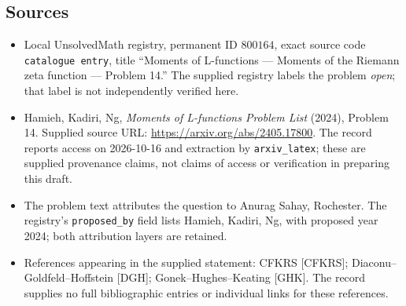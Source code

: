 \documentclass[11pt]{article}
\begin{document}
\subsection{Sources}
\begin{itemize}
\item Local UnsolvedMath registry, permanent ID \(800164\), exact source code \texttt{catalogue entry}, title ``Moments of L-functions --- Moments of the Riemann zeta function --- Problem 14.'' The supplied registry labels the problem \emph{open}; that label is not independently verified here.
\item Hamieh, Kadiri, Ng, \emph{Moments of L-functions Problem List} (2024), Problem 14. Supplied source URL: \url{https://arxiv.org/abs/2405.17800}. The record reports access on 2026-10-16 and extraction by \texttt{arxiv\_latex}; these are supplied provenance claims, not claims of access or verification in preparing this draft.
\item The problem text attributes the question to Anurag Sahay, Rochester. The registry's \texttt{proposed\_by} field lists Hamieh, Kadiri, Ng, with proposed year 2024; both attribution layers are retained.
\item References appearing in the supplied statement: CFKRS [CFKRS]; Diaconu--Goldfeld--Hoffstein [DGH]; Gonek--Hughes--Keating [GHK]. The record supplies no full bibliographic entries or individual links for these references.
\end{itemize}
\end{document}
